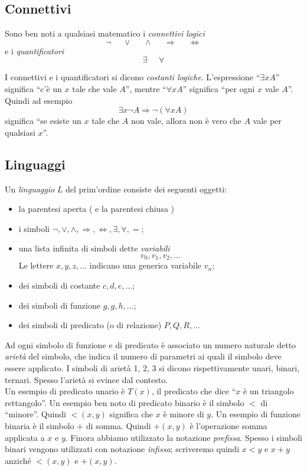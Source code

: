 \documentclass[12pt,a4paper]{report}
\theoremstyle{definition}
\theoremstyle{num.custom-title}
\DeclareMathOperator{\imp}{\Rightarrow}
\begin{document}
\subsection{Connettivi}

Sono ben noti a qualsiasi matematico i \emph{connettivi logici}
\[
\neg \;\;\;\;\; \vee \;\;\;\;\; \wedge \;\;\;\;\; \imp \;\;\;\;\; \Leftrightarrow
\]
e i \emph{quantificatori}
\[
\exists \;\;\;\;\; \forall
\]

I connettivi e i quantificatori si dicono \emph{costanti logiche}. L'espressione ``$\exists x A$'' significa ``c'è un $x$ tale che vale $A$'', mentre ``$\forall x A$'' significa ``per ogni $x$ vale $A$''. Quindi ad esempio
\[
\exists x \neg A \imp \neg (\forall x A)
\]
significa ``se esiste un $x$ tale che $A$ non vale, allora non è vero che $A$ vale per qualsiasi $x$''.


\subsection{Linguaggi}

Un \emph{linguaggio} $L$ del prim'ordine consiste dei seguenti oggetti:
\begin{itemize}
\item la parentesi aperta ( e la parentesi chiusa )
\item i simboli $\neg, \vee, \wedge, \imp, \Leftrightarrow, \exists, \forall, =$;
\item una lista infinita di simboli dette \emph{variabili}
\[
v_0, v_1, v_2,...
\]
Le lettere $x,y,z,...$ indicano una generica variabile $v_n$;
\item dei simboli di costante $c,d,e,...$;
\item dei simboli di funzione $g,g,h,...$;
\item dei simboli di predicato (o di relazione) $P,Q,R,...$
\end{itemize}
Ad ogni simbolo di funzione e di predicato è associato un numero naturale detto \emph{arietà} del simbolo, che indica il numero di parametri ai quali il simbolo deve essere applicato. I simboli di arietà 1, 2, 3 si dicono rispettivamente unari, binari, ternari. Spesso l'arietà si evince dal contesto.\\

Un esempio di predicato unario è $T(x)$, il predicato che dice ``$x$ è un triangolo rettangolo''. Un esempio ben noto di predicato binario è il simbolo $<$ di ``minore''. Quindi $<\!\!(x,y)$ significa che $x$ è minore di $y$. Un esempio di funzione binaria è il simbolo $+$ di somma. Quindi $+(x,y)$ è l'operazione somma applicata a $x$ e $y$. Finora abbiamo utilizzato la notazione \emph{prefissa}. Spesso i simboli binari vengono utilizzati con notazione \emph{infissa}; scriveremo quindi $x<y$ e $x+y$ anziché $<\!\!(x,y)$ e $+(x,y)$.
\end{document}
